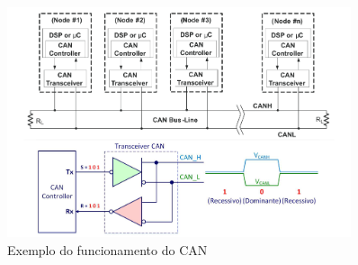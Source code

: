\documentclass[a4paper, 12pt, onecolumn, oneside]{scrartcl}
\begin{document}
\begin{figure}[H]
    \centering
    \includegraphics[width=0.9\textwidth]{Funcionamento_CAN.png}
    \caption{Exemplo do funcionamento do CAN}\label{fig4}
\end{figure}
\end{document}
